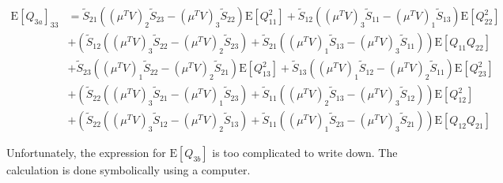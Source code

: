 \documentclass[10pt]{article}
\newcommand{\expect}[1]{\ensuremath{\mathrm{E}\left[ #1 \right]}}
\begin{document}
\begin{align}
	\expect{Q_{3a}}_{33} &= \tilde{S}_{21}\left( (\mu^TV)_2\tilde{S}_{23}-(\mu^TV)_3\tilde{S}_{22} \right)\expect{Q_{11}^2} + \tilde{S}_{12}\left( (\mu^TV)_3\tilde{S}_{11}-(\mu^TV)_1\tilde{S}_{13} \right)\expect{Q_{22}^2} \nonumber \\
	&+ \left( \tilde{S}_{12}\left( (\mu^TV)_3\tilde{S}_{22}-(\mu^TV)_2\tilde{S}_{23} \right) + \tilde{S}_{21}\left( (\mu^TV)_1\tilde{S}_{13}-(\mu^TV)_3\tilde{S}_{11} \right) \right)\expect{Q_{11}Q_{22}} \nonumber \\
	&+ \tilde{S}_{23}\left( (\mu^TV)_1\tilde{S}_{22}-(\mu^TV)_2\tilde{S}_{21} \right)\expect{Q_{13}^2} + \tilde{S}_{13}\left( (\mu^TV)_1\tilde{S}_{12}-(\mu^TV)_2\tilde{S}_{11} \right)\expect{Q_{23}^2} \nonumber \\
	&+ \left( \tilde{S}_{22}\left( (\mu^TV)_3\tilde{S}_{21}-(\mu^TV)_1\tilde{S}_{23} \right) + \tilde{S}_{11}\left( (\mu^TV)_2\tilde{S}_{13}-(\mu^TV)_3\tilde{S}_{12} \right) \right)\expect{Q_{12}^2} \nonumber \\
	&+ \left( \tilde{S}_{22}\left( (\mu^TV)_3\tilde{S}_{12}-(\mu^TV)_2\tilde{S}_{13} \right) + \tilde{S}_{11}\left( (\mu^TV)_1\tilde{S}_{23}-(\mu^TV)_3\tilde{S}_{21} \right) \right)\expect{Q_{12}Q_{21}}
\end{align}

Unfortunately, the expression for $\expect{Q_{3b}}$ is too complicated to write down.
The calculation is done symbolically using a computer.
\end{document}
